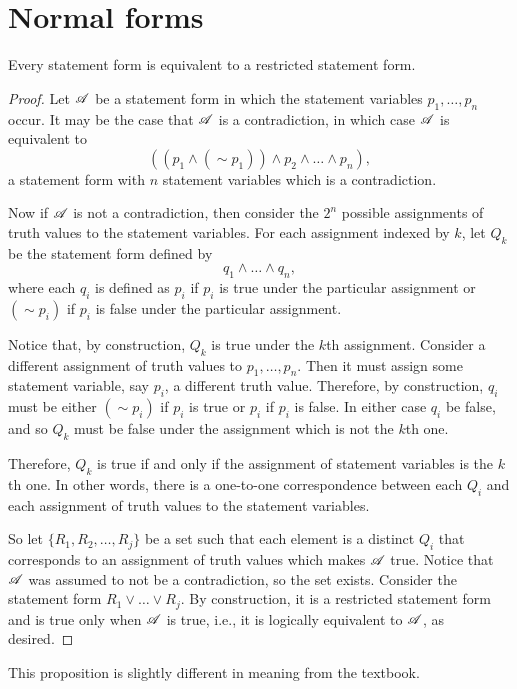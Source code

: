 \section{Normal forms}

\begin{proposition}
  Every statement form is equivalent to a restricted statement form.

  \begin{proof}
    Let \(\mathscr{A}\) be a statement form in which the statement variables \(p_1, \dots, p_n\) occur. It may be the case that \(\mathscr{A}\) is a contradiction, in which case \(\mathscr{A}\) is equivalent to
    \[((p_1 \land (\sim p_1)) \land p_2 \land \dots \land p_n),\]
    a statement form with \(n\) statement variables which is a contradiction.

    Now if \(\mathscr{A}\) is not a contradiction, then consider the \(2^n\) possible assignments of truth values to the statement variables. For each assignment indexed by \(k\), let \(Q_k\) be the statement form defined by
    \[q_1 \land \dots \land q_{n},\]
    where each \(q_i\) is defined as \(p_i\) if \(p_i\) is true under the particular assignment or \((\sim p_i)\) if \(p_i\) is false under the particular assignment.

    Notice that, by construction, \(Q_k\) is true under the \(k\)th assignment. Consider a different assignment of truth values to \(p_1, \dots, p_n\). Then it must assign some statement variable, say \(p_i\), a different truth value. Therefore, by construction, \(q_i\) must be either \((\sim p_i)\) if \(p_i\) is true or \(p_i\) if \(p_i\) is false. In either case \(q_i\) be false, and so \(Q_k\) must be false under the assignment which is not the \(k\)th one. 

    Therefore, \(Q_k\) is true if and only if the assignment of statement variables is the \(k\)th one. In other words, there is a one-to-one correspondence between each \(Q_i\) and each assignment of truth values to the statement variables.

    So let \(\{R_1, R_2, \dots, R_j\}\) be a set such that each element is a distinct \(Q_i\) that corresponds to an assignment of truth values which makes \(\mathscr{A}\) true. Notice that \(\mathscr{A}\) was assumed to not be a contradiction, so the set exists. Consider the statement form \(R_1 \lor \dots \lor R_j\). By construction, it is a restricted statement form and is true only when \(\mathscr{A}\) is true, i.e., it is logically equivalent to \(\mathscr{A}\), as desired.
  \end{proof}

  \note{} This proposition is slightly different in meaning from the textbook.
\end{proposition}

